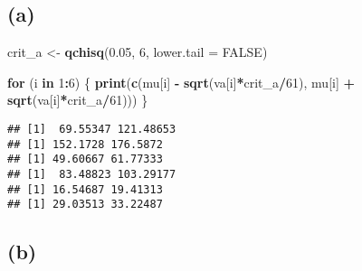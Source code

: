 \documentclass[
]{article}
\newenvironment{Shaded}{\begin{snugshade}}{\end{snugshade}}
\newcommand{\AttributeTok}[1]{\textcolor[rgb]{0.13,0.29,0.53}{#1}}
\newcommand{\ConstantTok}[1]{\textcolor[rgb]{0.56,0.35,0.01}{#1}}
\newcommand{\ControlFlowTok}[1]{\textcolor[rgb]{0.13,0.29,0.53}{\textbf{#1}}}
\newcommand{\DecValTok}[1]{\textcolor[rgb]{0.00,0.00,0.81}{#1}}
\newcommand{\FloatTok}[1]{\textcolor[rgb]{0.00,0.00,0.81}{#1}}
\newcommand{\FunctionTok}[1]{\textcolor[rgb]{0.13,0.29,0.53}{\textbf{#1}}}
\newcommand{\NormalTok}[1]{#1}
\newcommand{\OtherTok}[1]{\textcolor[rgb]{0.56,0.35,0.01}{#1}}
\newcommand{\SpecialCharTok}[1]{\textcolor[rgb]{0.81,0.36,0.00}{\textbf{#1}}}
\begin{document}
\subsection{(a)}\label{a}

\begin{Shaded}
\begin{Highlighting}[]
\NormalTok{crit\_a }\OtherTok{\textless{}{-}} \FunctionTok{qchisq}\NormalTok{(}\FloatTok{0.05}\NormalTok{, }\DecValTok{6}\NormalTok{, }\AttributeTok{lower.tail =} \ConstantTok{FALSE}\NormalTok{)}

\ControlFlowTok{for}\NormalTok{ (i }\ControlFlowTok{in} \DecValTok{1}\SpecialCharTok{:}\DecValTok{6}\NormalTok{) \{}
  \FunctionTok{print}\NormalTok{(}\FunctionTok{c}\NormalTok{(mu[i] }\SpecialCharTok{{-}} \FunctionTok{sqrt}\NormalTok{(va[i]}\SpecialCharTok{*}\NormalTok{crit\_a}\SpecialCharTok{/}\DecValTok{61}\NormalTok{), mu[i] }\SpecialCharTok{+} \FunctionTok{sqrt}\NormalTok{(va[i]}\SpecialCharTok{*}\NormalTok{crit\_a}\SpecialCharTok{/}\DecValTok{61}\NormalTok{)))}
\NormalTok{\}}
\end{Highlighting}
\end{Shaded}

\begin{verbatim}
## [1]  69.55347 121.48653
## [1] 152.1728 176.5872
## [1] 49.60667 61.77333
## [1]  83.48823 103.29177
## [1] 16.54687 19.41313
## [1] 29.03513 33.22487
\end{verbatim}

\subsection{(b)}\label{b}

\begin{Shaded}
\end{Shaded}
\end{document}
